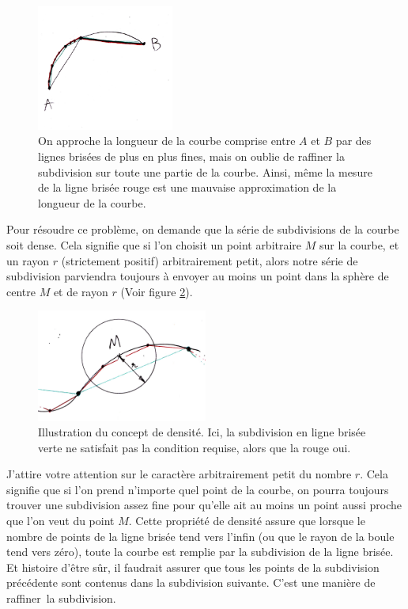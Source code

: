 	\begin{figure}
		\includegraphics[width=0.4\textwidth]{image/pi_nombre/defaut_longueur.jpg}
		\caption{On approche la longueur de la courbe comprise entre $A$ et $B$ par des lignes brisées de plus en plus fines, mais on oublie de raffiner la subdivision sur toute une partie de la courbe. Ainsi, même la  mesure de la ligne brisée rouge est une mauvaise approximation de la longueur de la courbe.}\label{fig_defaut_longueur}
	\end{figure}

	Pour résoudre ce problème, on demande que la série de subdivisions de la courbe soit dense. Cela signifie que si l'on choisit un point arbitraire $M$ sur la courbe, et un rayon $r$ (strictement positif) arbitrairement petit, alors notre série de subdivision parviendra toujours à envoyer au moins un point dans la sphère de centre $M$ et de rayon $r$ (Voir figure \ref{fig_densite}). 

	\begin{figure}
		\includegraphics[width=0.5\textwidth]{image/pi_nombre/densite.jpg}
		\caption{Illustration du concept de densité. Ici, la subdivision en ligne brisée verte ne satisfait pas la condition requise, alors que la rouge oui.}\label{fig_densite}
	\end{figure}

	J'attire votre attention sur le caractère arbitrairement petit du nombre $r$. Cela signifie que si l'on prend n'importe quel point de la courbe, on pourra toujours trouver une subdivision assez fine pour qu'elle ait au moins un point aussi proche que l'on veut du point $M$. Cette propriété de densité assure que lorsque le nombre de points de la ligne brisée tend vers l'infin (ou que le rayon de la boule tend vers zéro), toute la courbe est remplie par la subdivision de la ligne brisée. Et histoire d'être sûr, il faudrait assurer que tous les points de la subdivision précédente sont contenus dans la subdivision suivante. C'est une manière de \og{}raffiner\fg\, la subdivision.

